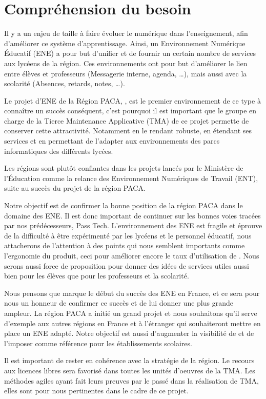 \section{Compréhension du besoin}
Il y a un enjeu de taille à faire évoluer le numérique dans l’enseignement, afin d’améliorer ce système d’apprentissage.  
Ainsi, un Environnement Numérique Éducatif (ENE) a pour but d’unifier et de fournir un certain nombre de services aux lycéens de la région. Ces environnements ont pour but d’améliorer le lien entre élèves et professeurs (Messagerie interne, agenda, …), mais aussi avec la scolarité (Absences, retards, notes, …).

Le projet d’ENE de la Région PACA, \correlyce{}, est le premier environnement de ce type à connaître un succès conséquent, c’est pourquoi il est important que le groupe en charge de la Tierce Maintenance Applicative (TMA) de ce projet permette de conserver cette attractivité. Notamment en le rendant robuste, en étendant ses services et en permettant de l’adapter aux environnements des parcs informatiques des différents lycées.

Les régions sont plutôt confiantes dans les projets lancés par le Ministère de l'Éducation comme la relance des Environnement Numériques de Travail (ENT), suite au succès du projet de la région PACA. 

Notre objectif est de confirmer la bonne position de la région PACA dans le domaine des ENE. Il est donc important de continuer sur les bonnes voies tracées par nos prédécesseurs, Pass Tech. 
L’environnement des ENE est fragile et éprouve de la difficulté à être expérimenté par les lycéens et le personnel éducatif, nous attacherons de l’attention à des points qui nous semblent importants comme l’ergonomie du produit, ceci pour améliorer encore le taux d’utilisation de \correlyce{}. Nous serons aussi force de proposition pour donner des idées de services utiles aussi bien pour les élèves que pour les professeurs et la scolarité.

 Nous pensons que \correlyce{} marque le début du succès des ENE en France, et ce sera pour nous un honneur de confirmer ce succès et de lui donner une plus grande ampleur. La région PACA a initié un grand projet et nous souhaitons qu’il serve d’exemple aux autres régions en France et à l’étranger qui souhaiteront mettre en place un ENE adapté. Notre objectif est aussi d’augmenter la visibilité de \correlyce{} et de l’imposer comme référence pour les établissements scolaires.

Il est important de rester en cohérence avec la stratégie de la région. Le recours aux licences libres sera favorisé dans toutes les unités d’oeuvres de la TMA. Les méthodes agiles ayant fait leurs preuves par le passé dans la réalisation de TMA, elles sont pour nous pertinentes dans le cadre de ce projet.
\vfill